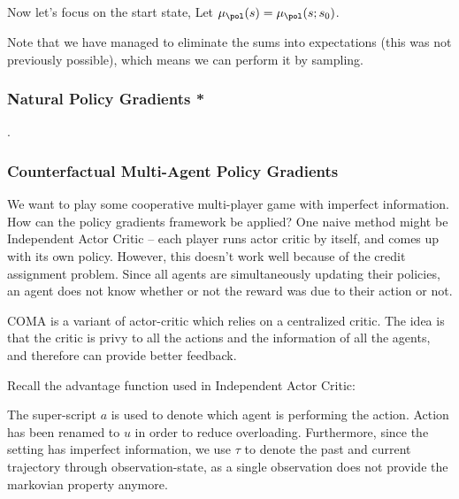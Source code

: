 \documentclass[12pt]{article}
\begin{document}

Now let's focus on the start state, Let $\mu_{\pol}(s) = \mu_{\pol}(s;s_0)$.


Note that we have managed to eliminate the sums into expectations (this was not previously possible), which means we can perform it by sampling.

\subsubsection{Natural Policy Gradients *}
.
\subsubsection{Counterfactual Multi-Agent Policy Gradients}

We want to play some cooperative multi-player game with imperfect information. How can the policy gradients framework be applied? One naive method might be Independent Actor Critic -- each player runs actor critic by itself, and comes up with its own policy. However, this doesn't work well because of the credit assignment problem. Since all agents are simultaneously updating their policies, an agent does not know whether or not the reward was due to their action or not.

COMA is a variant of actor-critic which relies on a centralized critic. The idea is that the critic is privy to all the actions and the information of all the agents, and therefore can provide better feedback. 

Recall the advantage function used in Independent Actor Critic:


The super-script $a$ is used to denote which agent is performing the action. Action has been renamed to $u$ in order to reduce overloading. Furthermore, since the setting has imperfect information, we use $\tau$ to denote the past and current trajectory through observation-state, as a single observation does not provide the markovian property anymore.
\end{document}
